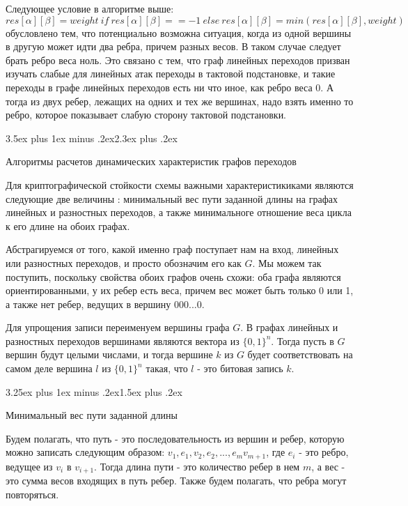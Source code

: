 \documentclass[a4paper,12pt]{report}
\makeatletter
\theoremstyle{plain} %
\theoremstyle{definition}
\theoremstyle{remark}
\renewcommand{\section}{\@startsection{section}{1}{18pt}%
{3.5ex plus 1ex minus .2ex}{2.3ex plus .2ex}%
{\normalfont\Large\bfseries\raggedright}}%
\renewcommand{\subsection}{\@startsection{subsection}{2}{18pt}%
{3.25ex plus 1ex minus .2ex}{1.5ex plus .2ex}%
{\normalfont\large\bfseries\raggedright}}%
\makeatother
\begin{document}
\begin{large}
Следующее условие в алгоритме выше: $$res[\alpha][\beta] = weight ~if~ res[\alpha][\beta] == -1 ~else~res[\alpha][\beta]=min(res[\alpha][\beta], weight)$$ обусловлено тем, что потенциально возможна ситуация, когда из одной вершины в другую может идти два ребра, причем разных весов. В таком случае следует брать ребро веса ноль. Это связано с тем, что граф линейных переходов призван изучать слабые для линейных атак переходы в тактовой подстановке, и такие переходы в графе линейных переходов есть ни что иное, как ребро веса 0. А тогда из двух ребер, лежащих на одних и тех же вершинах, надо взять именно то ребро, которое показывает слабую сторону тактовой подстановки.

\section{Алгоритмы расчетов динамических характеристик графов переходов}

Для криптографической стойкости схемы важными характеристикиками являются следующие две величины \cite{marchuk}: минимальный вес пути заданной длины на графах линейных и разностных переходов, а также минимальноге отношение веса цикла к его длине на обоих графах.

Абстрагируемся от того, какой именно граф поступает нам на вход, линейных или разностных переходов, и просто обозначим его как $G$. Мы можем так поступить, поскольку свойства обоих графов очень схожи: оба графа являются ориентированными, у их ребер есть веса, причем вес может быть только 0 или 1, а также нет ребер, ведущих в вершину 000...0.

Для упрощения записи переименуем вершины графа $G$. В графах линейных и разностных переходов вершинами являются вектора из $\{0, 1\}^n$. Тогда пусть в $G$ вершин будут целыми числами, и тогда вершине $k$ из $G$ будет соответствовать на самом деле вершина $l$ из $\{0, 1\}^n$ такая, что $l$ - это битовая запись $k$.

\subsection{Минимальный вес пути заданной длины}

Будем полагать, что путь - это последовательность из вершин и ребер, которую можно записать следующим образом: $v_1, e_1, v_2, e_2, ..., e_mv_{m+1}$, где $e_i$ - это ребро, ведущее из $v_i$ в $v_{i+1}$. Тогда длина пути - это количество ребер в нем $m$, а вес - это сумма весов входящих в путь ребер. Также будем полагать, что ребра могут повторяться.


\end{large}
\end{document}
